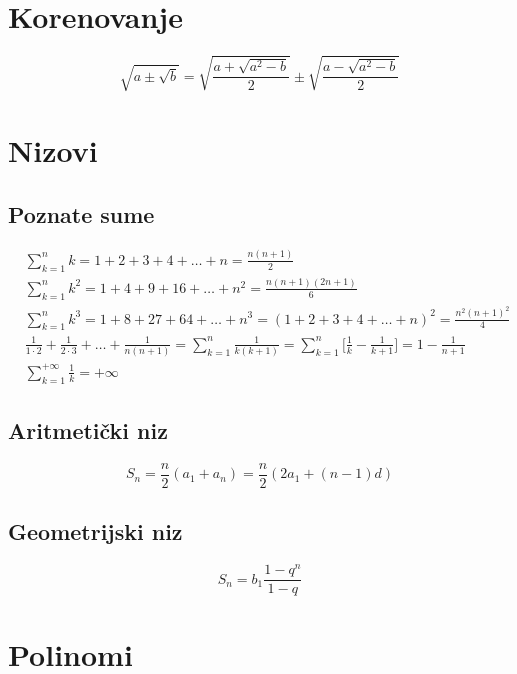 \documentclass[a4paper,12pt,twoside]{report}
\numberwithin{algorithm}{section}
\begin{document}
\section{Korenovanje}
\[
    \sqrt{a\pm \sqrt{b}} = \sqrt{\frac{a + \sqrt{a^2-b}}{2}} \pm \sqrt{\frac{a - \sqrt{a^2-b}}{2}}
\]
\newpage
\section{Nizovi}
\label{nizovi}
\subsection{Poznate sume}

\[
\begin{aligned}
    &\sum^n_{k=1}k=1+2+3+4+\dots+n=\frac{n(n+1)}{2}\\
    &\sum^n_{k=1}k^2=1 + 4+9+16+\dots+n^2=\frac{n(n+1)(2n+1)}{6}\\
    &\sum^n_{k=1}k^3=1+8+27+64+\dots+n^3=(1+2+3+4+\dots+n)^2= \frac{n^2(n+1)^2}{4}\\
    &\frac{1}{1\cdot2} + \frac{1}{2\cdot3} +\dots+ \frac{1}{n(n+1)}=\sum_{k=1}^n\frac{1}{k(k+1)}=\sum^n_{k=1}\bigg[\frac{1}{k}-\frac{1}{k+1}\bigg] = 1-\frac{1}{n+1}\\
    &\sum_{k = 1}^{+\infty} \frac{1}{k} = + \infty
\end{aligned}
\]
\subsection{Aritmetički niz}
\[
    S_n = \frac{n}{2}(a_1+a_n) = \frac{n}{2}(2a_1+(n-1)d)
\]
\subsection{Geometrijski niz}
\[
    S_n = b_1\frac{1 - q^n}{1 - q}
\]

\newpage
\section{Polinomi}
\label{polinomi}
\end{document}
